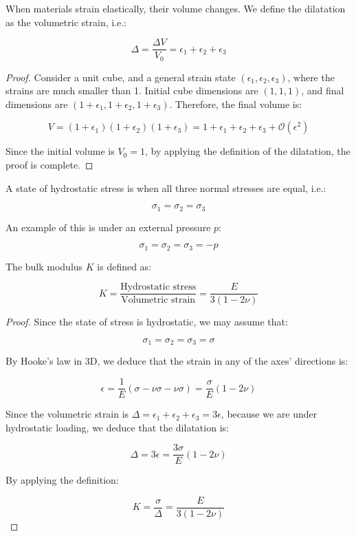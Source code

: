 \documentclass{article}
\begin{document}
\begin{proposition}[Dilatation]
    When materials strain elastically, their volume changes. We define the dilatation as the volumetric strain, i.e.:

    \[ \Delta = \frac{\Delta V}{V_0} = \epsilon_1 + \epsilon_2 + \epsilon_3 \]
\end{proposition}

\begin{proof}
    Consider a unit cube, and a general strain state $(\epsilon_1, \epsilon_2, \epsilon_3)$, where the strains are much smaller than 1. Initial cube dimensions are $(1, 1, 1)$, and final dimensions are $(1 + \epsilon_1, 1 + \epsilon_2, 1 + \epsilon_3)$. Therefore, the final volume is:

    \[ V = (1 + \epsilon_1)(1 + \epsilon_2)(1 + \epsilon_3) = 1 + \epsilon_1 + \epsilon_2 + \epsilon_3 + \mathcal{O}(\epsilon^2) \]

    Since the initial volume is $V_0 = 1$, by applying the definition of the dilatation, the proof is complete.
\end{proof}

\begin{definition}
    A state of hydrostatic stress is when all three normal stresses are equal, i.e.:

    \[ \sigma_1 = \sigma_2 = \sigma_3 \]

    An example of this is under an external pressure $p$:

    \[ \sigma_1 = \sigma_2 = \sigma_3 = -p \]
\end{definition}

\begin{proposition}
    The bulk modulus $K$ is defined as:

    \[ K = \frac{\text{Hydrostatic stress}}{\text{Volumetric strain}} = \frac{E}{3(1 - 2\nu)} \]
\end{proposition}

\begin{proof}
    Since the state of stress is hydrostatic, we may assume that:

    \[ \sigma_1 = \sigma_2 = \sigma_3 = \sigma \]

    By Hooke's law in 3D, we deduce that the strain in any of the axes' directions is:

    \[ \epsilon = \frac{1}{E}(\sigma - \nu\sigma - \nu\sigma) = \frac{\sigma}{E}(1 - 2\nu) \]

    Since the volumetric strain is $\Delta = \epsilon_1 + \epsilon_2 + \epsilon_3 = 3\epsilon$, because we are under hydrostatic loading, we deduce that the dilatation is:

    \[ \Delta = 3\epsilon = \frac{3\sigma}{E}(1 - 2\nu) \]

    By applying the definition:

    \[ K = \frac{\sigma}{\Delta} = \frac{E}{3(1 - 2\nu)} \]
\end{proof}
\end{document}
